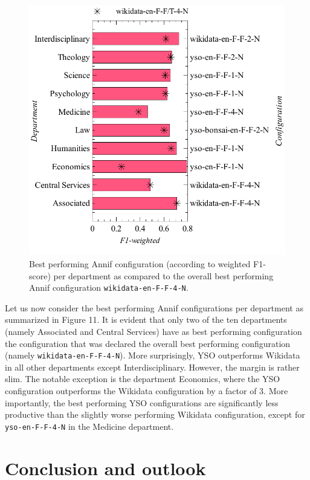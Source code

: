 \begin{figure}
\centering
\includegraphics{images/metrics_dept_summary.pdf}
\caption{Best performing Annif configuration (according to weighted
F1-score) per department as compared to the overall best performing
Annif configuration \texttt{wikidata-en-F-F-4-N}.}
\end{figure}

Let us now consider the best performing Annif configurations per
department as summarized in Figure 11. It is evident that only two of
the ten departments (namely Associated and Central Services) have as
best performing configuration the configuration that was declared the
overall best performing configuration (namely
\texttt{wikidata-en-F-F-4-N}). More surprisingly, YSO outperforms
Wikidata in all other departments except Interdisciplinary. However, the
margin is rather slim. The notable exception is the department
Economics, where the YSO configuration outperforms the Wikidata
configuration by a factor of 3. More importantly, the best performing
YSO configurations are significantly less productive than the slightly
worse performing Wikidata configuration, except for
\texttt{yso-en-F-F-4-N} in the Medicine department.

\hypertarget{conclusion-and-outlook}{%
\section{Conclusion and outlook}\label{conclusion-and-outlook}}

